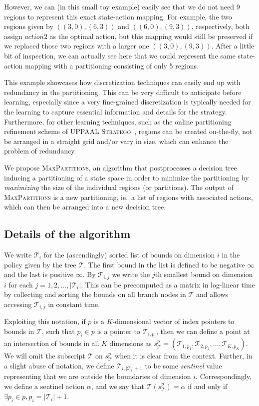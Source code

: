 However, we can (in this small toy example) easily see that we do not need 9
regions to represent this exact state-action mapping. For example, the two
regions given by $((3,0),(6,3))$ and $((6,0),(9,3))$, respectively, both assign
$action2$ as the optimal action, but this mapping would still be preserved if we
replaced those two regions with a larger one $((3,0),(9,3))$. After a little bit
of inspection, we can actually see here that we could represent the same
state-action mapping with a partitioning consisting of only 5 regions.

This example showcases how discretization techniques can easily end up with
redundancy in the partitioning. This can be very difficult to anticipate before
learning, especially since a very fine-grained discretization is typically
needed for the learning to capture essential information and details for the
strategy. Furthermore, for other learning techniques, such as the online
partitioning refinement scheme of \textsc{UPPAAL Stratego}~\cite{Manfred2019},
regions can be created on-the-fly, not be arranged in a straight grid and/or
vary in size, which can enhance the problem of redundancy.

We propose \textsc{MaxPartitions}, an algorithm that postprocesses a decision
tree inducing a partitioning of a state space in order to minimize the
partitioning by \textit{maximizing} the size of the individual regions (or
partitions). The output of \textsc{MaxPartitions} is a new partitioning, ie.\ a
list of regions with associated actions, which can then be arranged into a new
decision tree.


\subsection{Details of the algorithm}%
\label{sub:maxPartsDescription}

We write $\mathcal{T}_i$ for the (ascendingly) sorted list of bounds on
dimension $i$ in the policy given by the tree $\mathcal{T}$. The first bound in
the list is defined to be negative $\infty$ and the last is positive $\infty$.
By $\mathcal{T}_{i,j}$ we write the $j$th smallest bound on dimension $i$ for
each $j = 1, 2, \ldots, |\mathcal{T}_i|$. This can be precomputed as a matrix in
log-linear time by collecting and sorting the bounds on all branch nodes in
$\mathcal{T}$ and allows accessing $\mathcal{T}_{i,j}$ in constant time.

Exploiting this notation, if $p$ is a $K$-dimensional vector of index pointers
to bounds in $\mathcal{T}$, such that $p_i \in p$ is a pointer to
$\mathcal{T}_{i,p_i}$, then we can define a point at an intersection of bounds
in all $K$ dimensions as $s^{p}_{\mathcal{T}} = (\mathcal{T}_{1,p_1},
\mathcal{T}_{2,p_2}, \ldots, \mathcal{T}_{K,p_K})$. We will omit the subscript
$\mathcal{T}$ on $s^{p}_{\mathcal{T}}$ when it is clear from the context.
Further, in a slight abuse of notation, we define $\mathcal{T}_{i,
|\mathcal{T}_i| + 1}$ to be some \textit{sentinel} value representing that we
are outside the boundaries of dimension $i$.  Correspondingly, we define a
sentinel action $\alpha$, and we say that $\mathcal{T}(s^p_{\mathcal{T}}) =
\alpha$ if and only if $\exists p_i \in p, p_i = |\mathcal{T}_i| + 1$.

